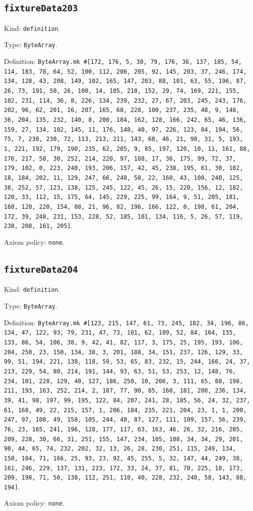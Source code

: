 \documentclass[11pt]{article}
\begin{document}
\subsection*{\texttt{fixtureData203}}
\noindent Kind: \texttt{definition}.\par
\noindent Type: \texttt{ByteArray}.\par
\noindent Definition: \texttt{ByteArray.mk \#[172, 176, 5, 30, 79, 176, 36, 137, 185, 54, 114, 183, 78, 64, 52, 100, 112, 206, 205, 92, 145, 203, 37, 246, 174, 134, 128, 43, 208, 149, 102, 165, 147, 203, 88, 101, 63, 55, 196, 87, 26, 73, 191, 50, 26, 100, 14, 105, 218, 152, 29, 74, 169, 221, 155, 102, 231, 114, 36, 8, 226, 134, 239, 232, 27, 67, 203, 245, 243, 176, 202, 96, 62, 201, 16, 207, 165, 68, 228, 100, 237, 235, 48, 9, 148, 36, 204, 135, 232, 140, 8, 200, 184, 162, 128, 166, 242, 65, 46, 136, 159, 27, 134, 102, 145, 11, 176, 148, 40, 97, 226, 123, 84, 194, 56, 75, 7, 230, 230, 72, 113, 213, 211, 143, 68, 46, 21, 98, 31, 5, 193, 1, 221, 192, 179, 190, 235, 62, 205, 9, 85, 197, 120, 10, 11, 161, 88, 176, 217, 58, 30, 252, 214, 220, 97, 188, 17, 36, 175, 99, 72, 37, 179, 102, 0, 223, 240, 193, 206, 157, 42, 45, 238, 195, 61, 30, 102, 18, 184, 202, 11, 129, 247, 66, 248, 58, 22, 160, 43, 100, 240, 125, 38, 252, 57, 123, 138, 125, 245, 122, 45, 26, 15, 220, 156, 12, 182, 120, 33, 112, 15, 175, 64, 145, 229, 225, 99, 164, 9, 51, 205, 181, 160, 120, 220, 154, 88, 21, 96, 82, 196, 166, 122, 0, 198, 61, 204, 172, 39, 248, 231, 153, 228, 52, 185, 101, 134, 116, 5, 26, 57, 119, 238, 208, 161, 205]}.\par
\noindent Axiom policy: \texttt{none}.\par
\subsection*{\texttt{fixtureData204}}
\noindent Kind: \texttt{definition}.\par
\noindent Type: \texttt{ByteArray}.\par
\noindent Definition: \texttt{ByteArray.mk \#[123, 215, 147, 61, 73, 245, 182, 34, 196, 86, 134, 47, 122, 93, 79, 231, 47, 73, 101, 62, 109, 52, 84, 164, 135, 133, 86, 54, 106, 38, 9, 42, 41, 82, 117, 3, 175, 25, 195, 193, 106, 204, 250, 23, 150, 134, 38, 3, 201, 188, 34, 151, 237, 126, 129, 33, 99, 51, 194, 221, 138, 118, 59, 53, 65, 83, 232, 15, 244, 166, 24, 37, 213, 229, 54, 80, 214, 191, 144, 93, 63, 51, 53, 253, 12, 148, 76, 234, 101, 228, 129, 40, 127, 186, 250, 10, 206, 3, 111, 65, 88, 198, 211, 193, 163, 252, 214, 2, 187, 77, 90, 85, 160, 181, 208, 236, 134, 39, 41, 98, 197, 99, 195, 122, 84, 207, 241, 28, 185, 56, 24, 32, 237, 61, 168, 49, 22, 215, 157, 1, 206, 184, 235, 221, 204, 23, 1, 1, 200, 247, 97, 108, 49, 158, 105, 244, 40, 87, 127, 111, 109, 157, 56, 239, 76, 23, 165, 241, 196, 128, 177, 117, 63, 163, 46, 26, 32, 216, 205, 209, 228, 30, 66, 31, 251, 155, 147, 234, 105, 108, 34, 34, 29, 201, 90, 44, 65, 74, 232, 202, 32, 13, 26, 28, 230, 251, 115, 249, 134, 150, 104, 71, 166, 25, 93, 23, 92, 45, 255, 5, 32, 147, 44, 249, 38, 161, 246, 229, 137, 131, 223, 172, 33, 24, 37, 81, 70, 225, 18, 173, 209, 198, 71, 50, 138, 112, 251, 110, 40, 228, 232, 240, 58, 143, 88, 194]}.\par
\noindent Axiom policy: \texttt{none}.\par
\end{document}
